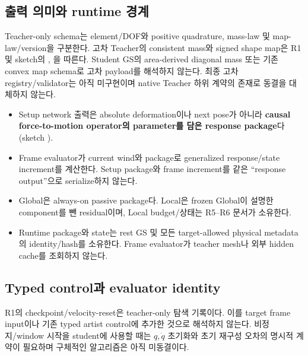 \documentclass[10pt]{article}
\begin{document}
\subsection{출력 의미와 runtime 경계}

Teacher-only schema는 element/DOF와 positive quadrature, mass-law 및 map-law/version을 구분한다.
고차 Teacher의 consistent mass와 signed shape map은 R1 및 sketch의
, 을 따른다.
Student GS의 area-derived diagonal mass 또는 기존 convex map schema로 고차 payload를 해석하지 않는다.
최종 고차 registry/validator는 아직 미구현이며 native Teacher 하위 계약의 존재로 동결을 대체하지 않는다.

\begin{itemize}
  \item Setup network 출력은 absolute deformation이나 next pose가 아니라
  \textbf{causal force-to-motion operator의 parameter를 담은 response package}다
  (sketch ).
  \item Frame evaluator가 current wind와 package로 generalized response/state increment를 계산한다.
  Setup package와 frame increment를 같은 ``response output''으로 serialize하지 않는다.
  \item Global은 always-on passive package다. Local은 frozen Global이 설명한 component를 뺀 residual이며,
  Local budget/상태는 R5--R6 문서가 소유한다.
  \item Runtime package와 state는 rest GS 및 모든 target-allowed physical metadata의 identity/hash를 소유한다.
  Frame evaluator가 teacher mesh나 외부 hidden cache를 조회하지 않는다.
\end{itemize}

\subsection{Typed control과 evaluator identity}

R1의 checkpoint/velocity-reset은 teacher-only 탐색 기록이다. 이를 target frame input이나 기존 typed
artist control에 추가한 것으로 해석하지 않는다. 비정지/window 시작을 student에 사용할 때는
\(q,\dot q\) 초기화와 초기 재구성 오차의 명시적 계약이 필요하며 구체적인 알고리즘은 아직 미동결이다.
\end{document}
